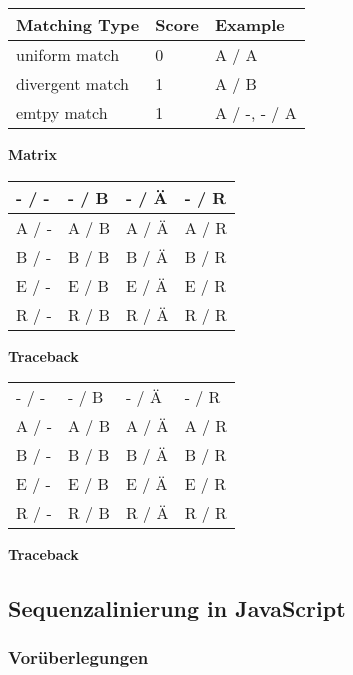 \begin{longtable}[c]{@{}lll@{}}
\toprule
Matching Type & Score & Example\tabularnewline
\midrule
\endhead
uniform match & 0 & A / A\tabularnewline
divergent match & 1 & A / B\tabularnewline
emtpy match & 1 & A / -, - / A\tabularnewline
\bottomrule
\end{longtable}

\par\noindent\textbf{Matrix}

\begin{tabular}[c]{|l|l|l|l|}
\hline
  - / - & - / B & - / Ä & - / R\\\hline
A / - & A / B & A / Ä & A / R\\\hline
B / - & B / B & B / Ä & B / R\\\hline
E / - & E / B & E / Ä & E / R\\\hline
R / - & R / B & R / Ä & R / R\\\hline
\end{tabular}









\par\noindent\textbf{Traceback}

\begin{longtable}[c]{@{}llll@{}}
\toprule
- / - & - / B & - / Ä & - / R\tabularnewline
A / - & A / B & A / Ä & A / R\tabularnewline
B / - & B / B & B / Ä & B / R\tabularnewline
E / - & E / B & E / Ä & E / R\tabularnewline
R / - & R / B & R / Ä & R / R\tabularnewline
\bottomrule
\end{longtable}





\par\noindent\textbf{Traceback}






\subsection{\texorpdfstring{{Sequenzalinierung in
JavaScript}}{Sequenzalinierung in JavaScript}}

\subsubsection{\texorpdfstring{{Vorüberlegungen}}{Vorüberlegungen}}

